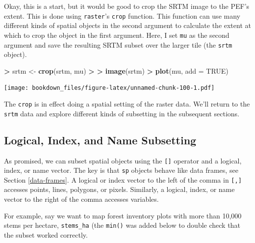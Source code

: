 \documentclass[]{krantz}
\makeatletter
\newenvironment{Shaded}{\begin{snugshade}}{\end{snugshade}}
\newcommand{\KeywordTok}[1]{\textcolor[rgb]{0.27,0.27,0.27}{\textbf{#1}}}
\newcommand{\DataTypeTok}[1]{\textcolor[rgb]{0.27,0.27,0.27}{#1}}
\newcommand{\StringTok}[1]{\textcolor[rgb]{0.5,0.5,0.5}{#1}}
\newcommand{\OtherTok}[1]{\textcolor[rgb]{0.37,0.37,0.37}{#1}}
\newcommand{\OperatorTok}[1]{\textcolor[rgb]{0.43,0.43,0.43}{\textbf{#1}}}
\newcommand{\ErrorTok}[1]{\textcolor[rgb]{0.14,0.14,0.14}{\textbf{#1}}}
\newcommand{\NormalTok}[1]{#1}
\newenvironment{kframe}{%
\medskip{}
\setlength{\fboxsep}{.8em}
 \def\at@end@of@kframe{}%
 \ifinner\ifhmode%
  \def\at@end@of@kframe{\end{minipage}}%
  \begin{minipage}{\columnwidth}%
 \fi\fi%
 \def\FrameCommand##1{\hskip\@totalleftmargin \hskip-\fboxsep
 \colorbox{shadecolor}{##1}\hskip-\fboxsep
     \hskip-\linewidth \hskip-\@totalleftmargin \hskip\columnwidth}%
 \MakeFramed {\advance\hsize-\width
   \@totalleftmargin\z@ \linewidth\hsize
   \@setminipage}}%
 {\par\unskip\endMakeFramed%
 \at@end@of@kframe}
\renewenvironment{Shaded}{\begin{kframe}}{\end{kframe}}
\theoremstyle{definition}
\theoremstyle{definition}
\theoremstyle{definition}
\theoremstyle{remark}
\makeatother
\begin{document}
Okay, this is a start, but it would be good to crop the SRTM image to
the PEF's extent. This is done using \texttt{raster}'s \texttt{crop}
function. This function can use many different kinds of spatial objects
in the second argument to calculate the extent at which to crop the
object in the first argument. Here, I set \texttt{mu} as the second
argument and save the resulting SRTM subset over the larger tile (the
\texttt{srtm} object).

\begin{Shaded}
\begin{Highlighting}[]
\OperatorTok{>}\StringTok{ }\NormalTok{srtm <-}\StringTok{ }\KeywordTok{crop}\NormalTok{(srtm, mu)}
\OperatorTok{>}\StringTok{ }
\ErrorTok{>}\StringTok{ }\KeywordTok{image}\NormalTok{(srtm)}
\OperatorTok{>}\StringTok{ }\KeywordTok{plot}\NormalTok{(mu, }\DataTypeTok{add =} \OtherTok{TRUE}\NormalTok{)}
\end{Highlighting}
\end{Shaded}

\texttt{[image: bookdown\_files/figure-latex/unnamed-chunk-100-1.pdf]}

The \texttt{crop} is in effect doing a spatial setting of the raster
data. We'll return to the \texttt{srtm} data and explore different kinds
of subsetting in the subsequent sections.

\subsection{Logical, Index, and Name
Subsetting}\label{logical-index-and-name-subsetting}

As promised, we can subset spatial objects using the \texttt{{[}{]}}
operator and a logical, index, or name vector. The key is that
\texttt{sp} objects behave like data frames, see Section
\ref{data-frames}. A logical or index vector to the left of the comma in
\texttt{{[},{]}} accesses points, lines, polygons, or pixels. Similarly,
a logical, index, or name vector to the right of the comma accesses
variables.

For example, say we want to map forest inventory plots with more than
10,000 stems per hectare, \texttt{stems\_ha} (the \texttt{min()} was
added below to double check that the subset worked correctly.

\begin{Shaded}
\end{Shaded}
\end{document}

